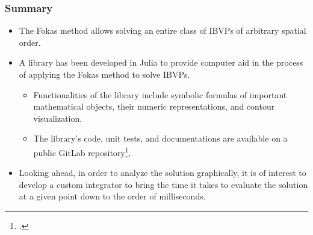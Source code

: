 \documentclass{beamer}
\begin{document}
\begin{frame}
    \frametitle{Summary}
    \begin{itemize}
        \item The Fokas method allows solving an entire class of IBVPs of arbitrary spatial order.
        \item A library has been developed in Julia to provide computer aid in the process of applying the Fokas method to solve IBVPs. 
        \begin{itemize}
            \item Functionalities of the library include symbolic formulas of important mathematical objects, their numeric representations, and contour visualization. 
            \item The library's code, unit tests, and documentations are available on a public GitLab repository\footcite{Xiao}.
        \end{itemize} 
        \item Looking ahead, in order to analyze the solution graphically, it is of interest to develop a custom integrator to bring the time it takes to evaluate the solution at a given point down to the order of milliseconds.
    \end{itemize}
\end{frame}

% 
% 


\end{document}
